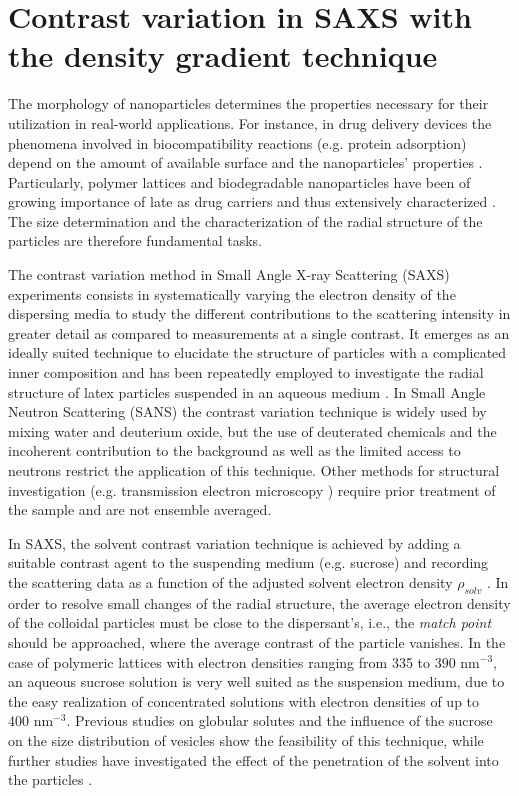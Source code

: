 \chapter{Contrast variation in SAXS with the density gradient technique}
\label{chap:density_gradient_SAXS}
The morphology of nanoparticles determines the properties necessary for their utilization in real-world applications. For instance, in drug delivery devices the phenomena involved in biocompatibility reactions (e.g. protein adsorption) depend on the amount of available surface and the nanoparticles' properties \citet{vittaz_effect_1996}. Particularly, polymer lattices and biodegradable nanoparticles have been of growing importance of late as drug carriers \citet{kattan_phase_1992} and thus extensively characterized \citet{soppimath_biodegradable_2001}. The size determination and the characterization of the radial structure of the particles are therefore fundamental tasks. 

The contrast variation method in Small Angle X-ray Scattering (SAXS) experiments consists in systematically varying the electron density of the dispersing media to study the different contributions to the scattering intensity in greater detail as compared to measurements at a single contrast. It emerges as an ideally suited technique to elucidate the structure of particles with a complicated inner composition and has been repeatedly employed to investigate the radial structure of latex particles suspended in an aqueous medium \citet{dingenouts_analysis_1999,ballauff_analysis_2011}. In Small Angle Neutron Scattering (SANS) the contrast variation technique is widely used by mixing water and deuterium oxide, but the use of deuterated chemicals and the incoherent contribution to the background as well as the limited access to neutrons restrict the application of this technique. Other methods for structural investigation (e.g. transmission electron microscopy \citet{joensson_morphology_1991,silverstein_microstructure_1989}) require prior treatment of the sample and are not ensemble averaged. 

In SAXS, the solvent contrast variation technique is achieved by adding a suitable contrast agent to the suspending medium (e.g. sucrose) and recording the scattering data as a function of the adjusted solvent electron density \( \rho_{solv} \) \citet{ballauff_saxs_2001-1,bolze_application_2003}. In order to resolve small changes of the radial structure, the average electron density of the colloidal particles must be close to the dispersant's, i.e., the \emph{match point} should be approached, where the average contrast of the particle vanishes. In the case of polymeric lattices with electron densities ranging from 335 to \(390 \mbox{ nm}^{-3}\), an aqueous sucrose solution is very well suited as the suspension medium, due to the easy realization of concentrated solutions with electron densities of up to \(400 \mbox{ nm}^{-3}\). Previous studies on globular solutes \citet{kawaguchi_isoscattering_1992-1} and the influence of the sucrose on the size distribution of vesicles \citet{kiselev_sucrose_2001-2} show the feasibility of this technique, while further studies have investigated the effect of the penetration of the solvent into the particles \citet{kawaguchi_isoscattering_1993}.

